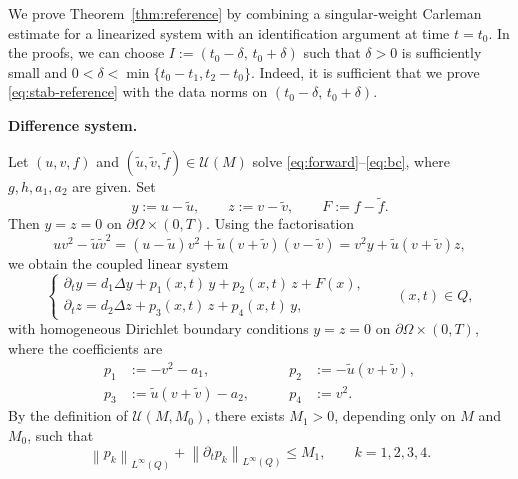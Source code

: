 \documentclass[12pt]{amsart}
\theoremstyle{plain}
\theoremstyle{definition}
\theoremstyle{remark}
\newcommand{\p}{\partial}
\newcommand{\norm}[1]{\left\lVert#1\right\rVert}
\newcommand{\Om}{\Omega}
\newcommand{\Dt}{\p_t}
\newcommand{\Lap}{\Delta}
\begin{document}
\label{sec:proof-lipschitz}


We prove Theorem~\ref{thm:reference} by combining a singular-weight Carleman estimate
for a linearized system with an identification argument at time $t=t_0$. In the proofs, we can choose $I:= (t_0-\delta, \, t_0+\delta)$ such that 
$\delta > 0$ is sufficiently small and $0<\delta<\min\{t_0-t_1,t_2-t_0\}$.
Indeed, it is sufficient that we prove \eqref{eq:stab-reference} with the data norms on $(t_0-\delta, \, t_0+\delta)$.


\medskip\noindent\textbf{Difference system.}

Let $(u,v,f)$ and $(\widetilde u,\widetilde v,\widetilde f)\in\mathcal{U}(M)$ 
solve
\eqref{eq:forward}--\eqref{eq:bc}, where $g, h, a_1, a_2$ are given.
Set
\[
y:=u-\widetilde u,\qquad z:=v-\widetilde v,\qquad F:=f-\widetilde f.
\]
Then $y=z=0$ on $\p\Om\times(0,T)$.
Using the factorisation
\begin{equation}\label{eq:factorisation}
u v^2-\widetilde u\widetilde v^2
=(u-\widetilde u)v^2+\widetilde u(v+\widetilde v)(v-\widetilde v)
=v^2 y + \widetilde u(v+\widetilde v)z,
\end{equation}
we obtain the coupled linear system
\begin{equation}\label{eq:diffsystem}
\begin{cases}
\Dt y = d_1 \Lap y + p_1(x,t)\,y + p_2(x,t)\,z + F(x),\\[3pt]
\Dt z = d_2 \Lap z + p_3(x,t)\,z + p_4(x,t)\,y,
\end{cases}
\qquad (x,t)\in Q,
\end{equation}
with homogeneous Dirichlet boundary conditions
$y=z=0$ on $\p\Om\times(0,T)$,
where the coefficients are
\begin{equation}\label{eq:pcoeff}
\begin{aligned}
p_1&:=-v^2-a_1,\qquad & p_2&:=-\widetilde u(v+\widetilde v),\\
p_3&:=\widetilde u(v+\widetilde v)-a_2,\qquad & p_4&:=v^2.
\end{aligned}
\end{equation}
By the definition of $\mathcal{U}(M,M_0)$, there exists $M_1>0$, depending
only on $M$ and $M_0$, such that
\begin{equation}\label{eq:pk-bounds}
\norm{p_k}_{L^\infty(Q)}+\norm{\p_t p_k}_{L^\infty(Q)}\le M_1,
\qquad k=1,2,3,4.
\end{equation}
\end{document}
